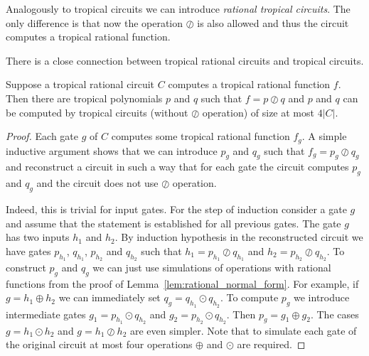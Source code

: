\documentclass[11pt]{article}
\newcommand{\ta}{\oplus}
\newcommand{\tp}{\odot}
\newcommand{\td}{\oslash}
\newcommand{\bb}[1]{\mathbb{#1}}
\begin{document}

Analogously to tropical circuits we can introduce \emph{rational tropical circuits}. The only difference is that now the operation $\td$ is also allowed and thus the circuit computes a tropical rational function. 

There is a close connection between tropical rational circuits and tropical circuits.

\begin{lemma} \label{lem:rational_to_poly}
Suppose a tropical rational circuit $C$ computes a tropical rational function $f$. Then there are tropical polynomials $p$ and $q$ such that $f = p \td q$ and $p $ and $q$ can be computed by tropical circuits (without $\td$ operation) of size at most $4 |C|$.
\end{lemma}

\begin{proof}
Each gate $g$ of $C$ computes some tropical rational function $f_g$. A simple inductive argument shows that we can introduce $p_g$ and $q_g$ such that $f_g = p_g \td q_g$ and reconstruct a circuit in such a way that for each gate the circuit computes $p_g$ and $q_g$ and the circuit does not use $\td$ operation. 

Indeed, this is trivial for input gates. For the step of induction consider a gate $g$ and assume that the statement is established for all previous gates. The gate $g$ has two inputs $h_1$ and $h_2$. By induction hypothesis in the reconstructed circuit we have gates $p_{h_1}$, $q_{h_1}$, $p_{h_2}$ and $q_{h_2}$ such that $h_1= p_{h_1} \td q_{h_1}$ and $h_2=p_{h_2} \td q_{h_2}$. To construct $p_g$ and $q_g$ we can just use simulations of operations with rational functions from the proof of Lemma~\ref{lem:rational_normal_form}. For example, if $g = h_1 \ta h_2$ we can immediately set $q_{g} = q_{h_1} \tp q_{h_2}$. To compute $p_g$ we introduce intermediate gates $g_1 = p_{h_1} \tp q_{h_2}$ and $g_2 = p_{h_2} \tp q_{h_2}$. Then $p_{g} = g_1 \ta g_2$. The cases $g = h_1 \tp h_2$ and $g = h_1 \td h_2$ are even simpler. Note that to simulate each gate of the original circuit at most four operations $\ta$ and $\tp$ are required.
\end{proof}
\end{document}
